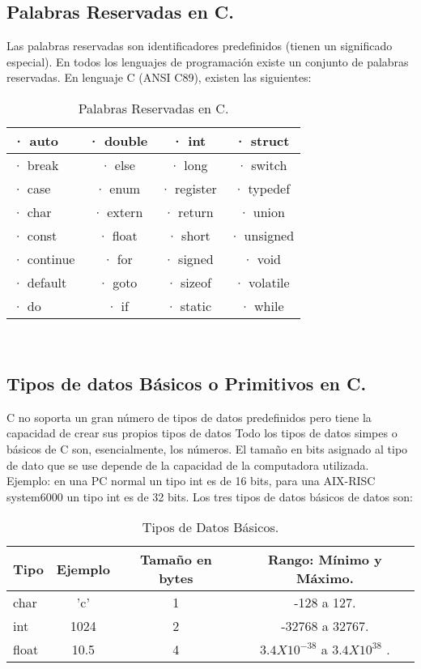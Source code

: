 \subsection{Palabras Reservadas en C.}
Las palabras reservadas son identificadores predefinidos (tienen un significado especial). En todos los lenguajes de programación existe un conjunto de palabras reservadas. En lenguaje C (ANSI C89), existen las siguientes:
\begin{table}
	\centering
\begin{tabular}{l | c | c | c } 
	\hline
· auto & · double & · int & · struct \\ \hline
· break	& · else & · long & · switch \\ \hline
· case & · enum & · register & · typedef \\ \hline
· char & · extern & · return &· union \\ \hline
· const	& · float & · short & · unsigned \\ \hline 
· continue & · for & · signed & · void \\ \hline 
· default & · goto & · sizeof & · volatile \\ \hline 
· do & · if & · static & · while \\  
\hline
\end{tabular}
\\
\caption{\label{tab:Palabras reservdas en C}Palabras Reservadas en C.}
\end{table}
\subsection{Tipos de datos Básicos o Primitivos en C.}
C no soporta un gran número de tipos de datos predefinidos pero tiene la capacidad de crear sus propios tipos de datos Todo los tipos de datos simpes o básicos de C son, esencialmente, los números. El tamaño en bits asignado al  tipo  de  dato  que  se  use depende de la capacidad de la computadora utilizada. Ejemplo: en una PC normal un tipo int es de 16 bits, para  una AIX-RISC system6000 un tipo int es de 32 bits. Los tres tipos de datos básicos de datos son: 

\begin{table}[H]
	\centering
 \begin{tabular}{l | c | c | c }
\hline
Tipo & Ejemplo & Tamaño en bytes & Rango: Mínimo y Máximo.\\ \hline
char & 'c' & 1 & -128 a 127.\\ \hline
int & 1024 & 2 & -32768 a 32767. \\ \hline
float & 10.5 & 4 & $3.4X{10}^{-38}$ a $3.4X{10}^{38}$ . \\
\hline
\end{tabular}
\\
\caption{\label{tab:Tipos de Datos Básicos}Tipos de Datos Básicos.}
\end{table} 
\\


